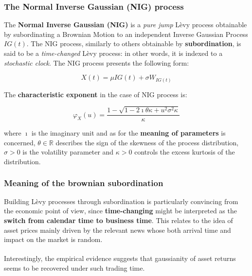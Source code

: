 \documentclass{beamer}
\begin{document}
\begin{frame}
\frametitle{The Normal Inverse Gaussian (NIG) process}
	The \textbf{Normal Inverse Gaussian (NIG)} is a \emph{pure jump} Lèvy process obtainable by subordinating a Brownian Motion to an independent Inverse Gaussian Process $IG(t)$. The NIG process, similarly to others obtainable by \textbf{subordination}, is said to be a \emph{time-changed} Lèvy process: in other words, it is indexed to a \textit{stochastic clock}. The NIG process presents the following form:

	\begin{equation}
		X(t) = \mu IG(t) + \sigma W_{IG(t)}
	\end{equation}

	The \textbf{characteristic exponent} in the case of NIG process is:

	\begin{equation}
		\varphi_{X}(u) =  \frac{1- \sqrt{1-2 \imath \theta \kappa + u^{2}\sigma^{2}\kappa}}{\kappa}
	\end{equation}

	where $\imath$ is the imaginary unit and as for the \textbf{meaning of parameters }is concerned, $\theta \in \mathbb{R}$ describes the sign of the skewness of the process distribution, $\sigma > 0 $ is the volatility parameter and $\kappa > 0$ controls the excess kurtosis of the distribution.
\end{frame}

\begin{frame}
\frametitle{Meaning of the brownian subordination}
	Building Lèvy processes through subordination is particularly convincing from the economic point of view, since \textbf{time-changing} might be interpreted as the \textbf{switch from calendar time to business time}. This relates to the idea  of asset prices mainly driven by the relevant news whose both arrival time and impact on the market is random.\\~\\

	Interestingly, the empirical evidence suggests that gaussianity of asset returns seems to be recovered under such trading time. \\~\\

\end{frame}
\end{document}
